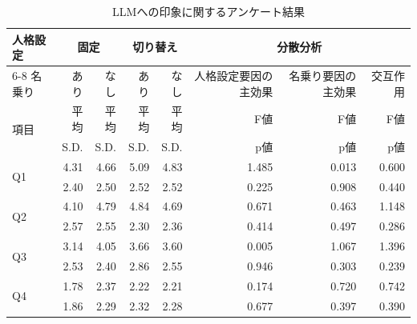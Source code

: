 \documentclass[10pt,twocolumn]{jsarticle}
\begin{document}
\begin{table}[htbp]
    \centering
    \caption{LLMへの印象に関するアンケート結果}
    \label{tab:anova_result}
    \renewcommand{\arraystretch}{1.2} %

    \scriptsize   %
    
    \begin{tabular*}{\textwidth}{@{\extracolsep{\fill}}lrrrrrrr}
        \hline
        人格設定 & \multicolumn{2}{c}{固定} & \multicolumn{2}{c}{切り替え} & \multicolumn{3}{c}{分散分析} \\
        \cline{6-8}
        名乗り & あり & なし & あり & なし & 人格設定要因の主効果  & 名乗り要因の主効果  & 交互作用 \\
        \hline
        \multirow{2}{*}{項目} & 平均 & 平均 & 平均 & 平均 & F値 & F値 & F値\\
         & S.D. & S.D. & S.D. & S.D. & p値 & p値 & p値 \\
        \hline \hline
        
        \multirow{2}{*}{Q1} & 4.31 & 4.66 & 5.09 & 4.83 & 1.485 & 0.013 & 0.600 \\
         & 2.40 & 2.50 & 2.52 & 2.52 & 0.225 & 0.908 & 0.440 \\ 
        
        \multirow{2}{*}{Q2} & 4.10 & 4.79 & 4.84 & 4.69 & 0.671 & 0.463 & 1.148 \\
         & 2.57 & 2.55 & 2.30 & 2.36 & 0.414 & 0.497 & 0.286 \\ 
        
        \multirow{2}{*}{Q3} & 3.14 & 4.05 & 3.66 & 3.60 & 0.005 & 1.067 & 1.396 \\
         & 2.53 & 2.40 & 2.86 & 2.55 & 0.946 & 0.303 & 0.239 \\ 
        
        \multirow{2}{*}{Q4} & 1.78 & 2.37 & 2.22 & 2.21 & 0.174 & 0.720 & 0.742 \\
         & 1.86 & 2.29 & 2.32 & 2.28 & 0.677 & 0.397 & 0.390 \\ 
        

\end{tabular*}
\end{table}
\end{document}
